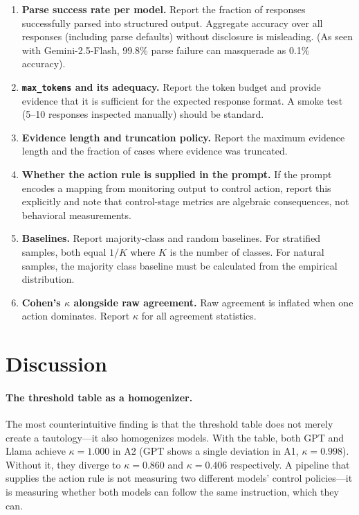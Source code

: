 \documentclass[11pt]{article}
\begin{document}
\begin{enumerate}
    \item \textbf{Parse success rate per model.} Report the fraction of responses successfully parsed into structured output. Aggregate accuracy over all responses (including parse defaults) without disclosure is misleading. (As seen with Gemini-2.5-Flash, 99.8\% parse failure can masquerade as 0.1\% accuracy).
    \item \textbf{\texttt{max\_tokens} and its adequacy.} Report the token budget and provide evidence that it is sufficient for the expected response format. A smoke test (5--10 responses inspected manually) should be standard.
    \item \textbf{Evidence length and truncation policy.} Report the maximum evidence length and the fraction of cases where evidence was truncated.
    \item \textbf{Whether the action rule is supplied in the prompt.} If the prompt encodes a mapping from monitoring output to control action, report this explicitly and note that control-stage metrics are algebraic consequences, not behavioral measurements.
    \item \textbf{Baselines.} Report majority-class and random baselines. For stratified samples, both equal $1/K$ where $K$ is the number of classes. For natural samples, the majority class baseline must be calculated from the empirical distribution.
    \item \textbf{Cohen's $\kappa$ alongside raw agreement.} Raw agreement is inflated when one action dominates. Report $\kappa$ for all agreement statistics.
\end{enumerate}

\section{Discussion}

\paragraph{The threshold table as a homogenizer.} The most counterintuitive finding is that the threshold table does not merely create a tautology---it also homogenizes models. With the table, both GPT and Llama achieve $\kappa = 1.000$ in A2 (GPT shows a single deviation in A1, $\kappa = 0.998$). Without it, they diverge to $\kappa = 0.860$ and $\kappa = 0.406$ respectively. A pipeline that supplies the action rule is not measuring two different models' control policies---it is measuring whether both models can follow the same instruction, which they can.
\end{document}
